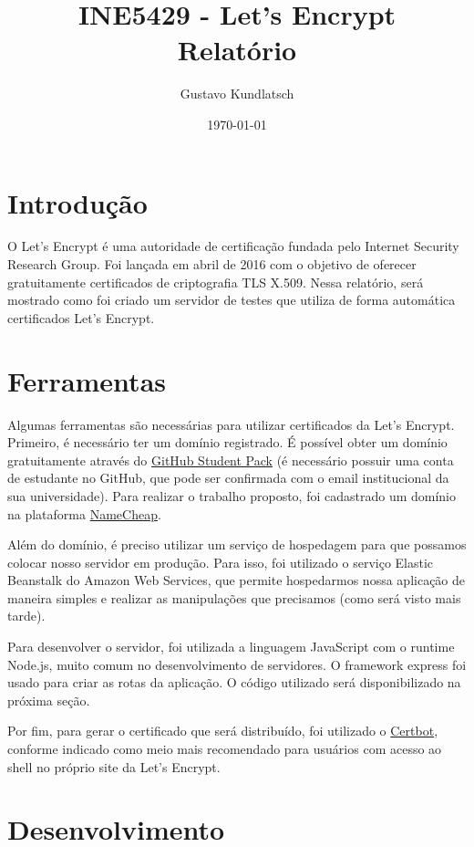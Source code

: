\documentclass{article}
\title{INE5429 - Let's Encrypt \\ Relatório}
\author{Gustavo Kundlatsch}
\date{\today}
\begin{document}
\maketitle

\section{Introdução}

O Let's Encrypt é uma autoridade de certificação fundada pelo Internet Security Research Group. Foi lançada em abril de 2016 com o objetivo de oferecer gratuitamente certificados de criptografia TLS X.509. Nessa relatório, será mostrado como foi criado um servidor de testes que utiliza de forma automática certificados Let's Encrypt.

\section{Ferramentas}

Algumas ferramentas são necessárias para utilizar certificados da Let's Encrypt. Primeiro, é necessário ter um domínio registrado. É possível obter um domínio gratuitamente através do \href{https://education.github.com/pack}{GitHub Student Pack} (é necessário possuir uma conta de estudante no GitHub, que pode ser confirmada com o email institucional da sua universidade). Para realizar o trabalho proposto, foi cadastrado um domínio na plataforma \href{https://www.namecheap.com/}{NameCheap}.

Além do domínio, é preciso utilizar um serviço de hospedagem para que possamos colocar nosso servidor em produção. Para isso, foi utilizado o serviço Elastic Beanstalk do Amazon Web Services, que permite hospedarmos nossa aplicação de maneira simples e realizar as manipulações que precisamos (como será visto mais tarde).

Para desenvolver o servidor, foi utilizada a linguagem JavaScript com o runtime Node.js, muito comum no desenvolvimento de servidores. O framework express foi usado para criar as rotas da aplicação. O código utilizado será disponibilizado na próxima seção.

Por fim, para gerar o certificado que será distribuído, foi utilizado o \href{https://certbot.eff.org/}{Certbot}, conforme indicado como meio mais recomendado para usuários com acesso ao shell no próprio site da Let's Encrypt.

\section{Desenvolvimento}
\end{document}
